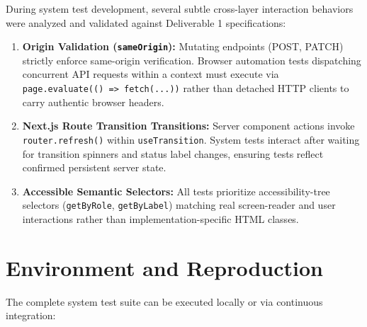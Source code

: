 \documentclass[10pt]{article}
\begin{document}
During system test development, several subtle cross-layer interaction behaviors were analyzed and validated against Deliverable 1 specifications:
\begin{enumerate}
  \item \textbf{Origin Validation (\texttt{sameOrigin}):} Mutating endpoints (POST, PATCH) strictly enforce same-origin verification. Browser automation tests dispatching concurrent API requests within a context must execute via \texttt{page.evaluate(() => fetch(...))} rather than detached HTTP clients to carry authentic browser headers.
  \item \textbf{Next.js Route Transition Transitions:} Server component actions invoke \texttt{router.refresh()} within \texttt{useTransition}. System tests interact after waiting for transition spinners and status label changes, ensuring tests reflect confirmed persistent server state.
  \item \textbf{Accessible Semantic Selectors:} All tests prioritize accessibility-tree selectors (\texttt{getByRole}, \texttt{getByLabel}) matching real screen-reader and user interactions rather than implementation-specific HTML classes.
\end{enumerate}

\section{Environment and Reproduction}

The complete system test suite can be executed locally or via continuous integration:
\end{document}
